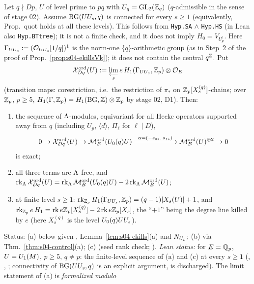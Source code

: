\begin{theorem}\label{thm:s04-lambdaribet}
Let $q\nmid Dp$, $U$ of level prime to $pq$ with $U_q=\mathrm{GL}_2(\mathbb{Z}_q)$ ($q$-admissible in the sense of stage 02). Assume $\mathrm{BG}(UU_s,q)$ is
connected for every $s\ge1$ (equivalently, Prop.~quot holds at all these levels). This follows from \texttt{Hyp.SA} $\wedge$
\texttt{Hyp.HS} (in Lean also \texttt{Hyp.BTtree}); it is not a finite check, and it does not imply $H_0=V_{U_p^1}$.
Here $\Gamma_{UU_s}:=(\mathcal{O}_{UU_s}[1/q])^1$ is the norm-one $\{q\}$-arithmetic group (as in Step~2 of the proof of Prop.~\ref{prop:s04-ekillsVk}); it does not
contain the central $q^{\mathbb{Z}}$. Put
\[\mathcal{X}^{\mathrm{ord}}_{Dq}(U):=\varprojlim_se\,H_1(\Gamma_{UU_s},\mathbb{Z}_p)\otimes\mathcal{O}_E\]
(transition maps: corestriction, i.e.\ the restriction of $\pi_*$ on $\mathbb{Z}_p[X^{(q)}_s]$-chains; over $\mathbb{Z}_p$, $p\ge5$,
$H_1(\Gamma,\mathbb{Z}_p)=H_1(\mathrm{BG},\mathbb{Z})\otimes\mathbb{Z}_p$ by stage 02, D1). Then:
\begin{enumerate}[label=(\alph*)]
\item the sequence of $\Lambda$-modules, equivariant for all Hecke operators supported away from $q$ (including $U_p$, $\langle d\rangle$,
  $\Pi_\ell$ for $\ell\mid D$),
  \[0\to\Xord_{Dq}(U)\to\Mord(\Uzero{q}U)\xrightarrow{\ \alpha=(-s_{0*},\,s_{1*})\ }\Mord(U)^{\oplus2}\to0\]
  is exact;
\item all three terms are $\Lambda$-free, and $\operatorname{rk}_\Lambda\mathcal{X}^{\mathrm{ord}}_{Dq}(U)=\operatorname{rk}_\Lambda\mathcal{M}^{\mathrm{ord}}_B(U_0(q)U)-2\operatorname{rk}_\Lambda\mathcal{M}^{\mathrm{ord}}_B(U)$;
\item at finite level $s\ge1$: $\operatorname{rk}_{\mathbb{Z}_p}H_1(\Gamma_{UU_s},\mathbb{Z}_p)=(q-1)|X_s(U)|+1$, and $\operatorname{rk}_{\mathbb{Z}_p}e\,H_1=\operatorname{rk} e\mathbb{Z}_p[X^{(q)}_{s}]-2\operatorname{rk} e\mathbb{Z}_p[X_s]$,
  the ``$+1$'' being the degree line killed by $e$ (here $X^{(q)}_s$ is the level $U_0(q)UU_s$).
\end{enumerate}
Status: (a) \stproved{} below given , Lemma~\ref{lem:s04-ekills}(a) and $N_{U_p}$; (b) \stproved{} via
Thm.~\ref{thm:s04-control}(a); (c) \stproved{} (seed rank check; ). \emph{Lean status:} \stformal{} for $E=\mathbb{Q}_p$, $U=U_1(M)$, $p\ge5$, $q\ne p$:
the finite-level sequence of (a) and (c) at every $s\ge1$ (,
, ; connectivity of $\mathrm{BG}(UU_s,q)$ is an explicit
argument,  is discharged). The limit statement of (a) is \emph{formalized modulo }

\end{theorem}
